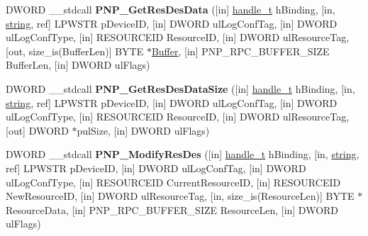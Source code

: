 \begin{DoxyCompactItemize}
\item 
\mbox{\label{interfacepnp_a7eec93eba41d050ebeeb18bc44840a61}} 
D\+W\+O\+RD \+\_\+\+\_\+stdcall {\bfseries P\+N\+P\+\_\+\+Get\+Res\+Des\+Data} (\mbox{[}in\mbox{]} \hyperlink{interfacevoid}{handle\+\_\+t} h\+Binding, \mbox{[}in, \hyperlink{structstring}{string}, ref\mbox{]} L\+P\+W\+S\+TR p\+Device\+ID, \mbox{[}in\mbox{]} D\+W\+O\+RD ul\+Log\+Conf\+Tag, \mbox{[}in\mbox{]} D\+W\+O\+RD ul\+Log\+Conf\+Type, \mbox{[}in\mbox{]} R\+E\+S\+O\+U\+R\+C\+E\+ID Resource\+ID, \mbox{[}in\mbox{]} D\+W\+O\+RD ul\+Resource\+Tag, \mbox{[}out, size\+\_\+is(Buffer\+Len)\mbox{]} B\+Y\+TE $\ast$\hyperlink{class_buffer}{Buffer}, \mbox{[}in\mbox{]} P\+N\+P\+\_\+\+R\+P\+C\+\_\+\+B\+U\+F\+F\+E\+R\+\_\+\+S\+I\+ZE Buffer\+Len, \mbox{[}in\mbox{]} D\+W\+O\+RD ul\+Flags)
\item 
\mbox{\label{interfacepnp_ac86c62d366816fc1b4fe6daaca9b5b3a}} 
D\+W\+O\+RD \+\_\+\+\_\+stdcall {\bfseries P\+N\+P\+\_\+\+Get\+Res\+Des\+Data\+Size} (\mbox{[}in\mbox{]} \hyperlink{interfacevoid}{handle\+\_\+t} h\+Binding, \mbox{[}in, \hyperlink{structstring}{string}, ref\mbox{]} L\+P\+W\+S\+TR p\+Device\+ID, \mbox{[}in\mbox{]} D\+W\+O\+RD ul\+Log\+Conf\+Tag, \mbox{[}in\mbox{]} D\+W\+O\+RD ul\+Log\+Conf\+Type, \mbox{[}in\mbox{]} R\+E\+S\+O\+U\+R\+C\+E\+ID Resource\+ID, \mbox{[}in\mbox{]} D\+W\+O\+RD ul\+Resource\+Tag, \mbox{[}out\mbox{]} D\+W\+O\+RD $\ast$pul\+Size, \mbox{[}in\mbox{]} D\+W\+O\+RD ul\+Flags)
\item 
\mbox{\label{interfacepnp_a23746d8bde798d1c9df41b038b181c34}} 
D\+W\+O\+RD \+\_\+\+\_\+stdcall {\bfseries P\+N\+P\+\_\+\+Modify\+Res\+Des} (\mbox{[}in\mbox{]} \hyperlink{interfacevoid}{handle\+\_\+t} h\+Binding, \mbox{[}in, \hyperlink{structstring}{string}, ref\mbox{]} L\+P\+W\+S\+TR p\+Device\+ID, \mbox{[}in\mbox{]} D\+W\+O\+RD ul\+Log\+Conf\+Tag, \mbox{[}in\mbox{]} D\+W\+O\+RD ul\+Log\+Conf\+Type, \mbox{[}in\mbox{]} R\+E\+S\+O\+U\+R\+C\+E\+ID Current\+Resource\+ID, \mbox{[}in\mbox{]} R\+E\+S\+O\+U\+R\+C\+E\+ID New\+Resource\+ID, \mbox{[}in\mbox{]} D\+W\+O\+RD ul\+Resource\+Tag, \mbox{[}in, size\+\_\+is(Resource\+Len)\mbox{]} B\+Y\+TE $\ast$Resource\+Data, \mbox{[}in\mbox{]} P\+N\+P\+\_\+\+R\+P\+C\+\_\+\+B\+U\+F\+F\+E\+R\+\_\+\+S\+I\+ZE Resource\+Len, \mbox{[}in\mbox{]} D\+W\+O\+RD ul\+Flags)
\item 
\mbox{\label{interfacepnp_a1550a3dc683586d9872e75116a5921e9}} 

\end{DoxyCompactItemize}
